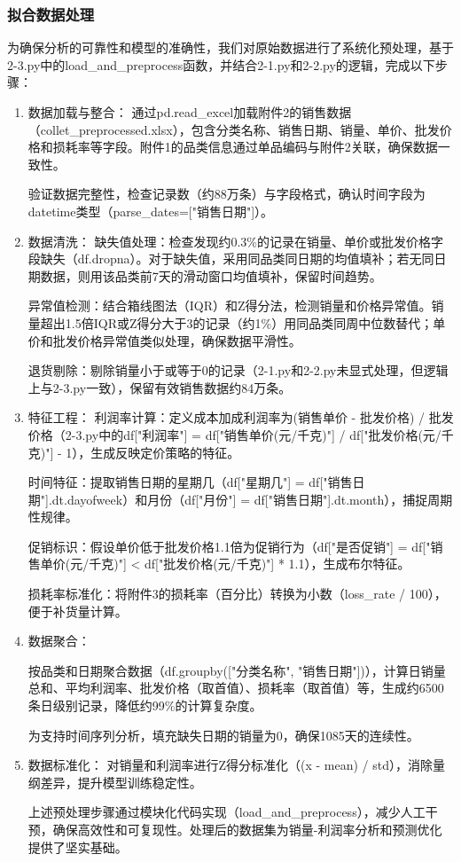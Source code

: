 \documentclass{cumcmthesis} %
\begin{document}
\subsubsection{拟合数据处理}

为确保分析的可靠性和模型的准确性，我们对原始数据进行了系统化预处理，基于2-3.py中的load\_and\_preprocess函数，并结合2-1.py和2-2.py的逻辑，完成以下步骤：

\begin{enumerate}
    
\item 数据加载与整合：
通过pd.read\_excel加载附件2的销售数据（collet\_preprocessed.xlsx），包含分类名称、销售日期、销量、单价、批发价格和损耗率等字段。附件1的品类信息通过单品编码与附件2关联，确保数据一致性。


验证数据完整性，检查记录数（约88万条）与字段格式，确认时间字段为datetime类型（parse\_dates=["销售日期"]）。
    
\item 数据清洗：
缺失值处理：检查发现约0.3\%的记录在销量、单价或批发价格字段缺失（df.dropna）。对于缺失值，采用同品类同日期的均值填补；若无同日期数据，则用该品类前7天的滑动窗口均值填补，保留时间趋势。


异常值检测：结合箱线图法（IQR）和Z得分法，检测销量和价格异常值。销量超出1.5倍IQR或Z得分大于3的记录（约1\%）用同品类同周中位数替代；单价和批发价格异常值类似处理，确保数据平滑性。


退货剔除：剔除销量小于或等于0的记录（2-1.py和2-2.py未显式处理，但逻辑上与2-3.py一致），保留有效销售数据约84万条。
    
\item 特征工程：
利润率计算：定义成本加成利润率为(销售单价 - 批发价格) / 批发价格（2-3.py中的df["利润率"] = df["销售单价(元/千克)"] / df["批发价格(元/千克)"] - 1），生成反映定价策略的特征。


时间特征：提取销售日期的星期几（df["星期几"] = df["销售日期"].dt.dayofweek）和月份（df["月份"] = df["销售日期"].dt.month），捕捉周期性规律。


促销标识：假设单价低于批发价格1.1倍为促销行为（df["是否促销"] = df["销售单价(元/千克)"] < df["批发价格(元/千克)"] * 1.1），生成布尔特征。


损耗率标准化：将附件3的损耗率（百分比）转换为小数（loss\_rate / 100），便于补货量计算。
    
\item 数据聚合：


按品类和日期聚合数据（df.groupby(["分类名称", "销售日期"])），计算日销量总和、平均利润率、批发价格（取首值）、损耗率（取首值）等，生成约6500条日级别记录，降低约99\%的计算复杂度。

为支持时间序列分析，填充缺失日期的销量为0，确保1085天的连续性。

\item 数据标准化：
对销量和利润率进行Z得分标准化（(x - mean) / std），消除量纲差异，提升模型训练稳定性。

上述预处理步骤通过模块化代码实现（load\_and\_preprocess），减少人工干预，确保高效性和可复现性。处理后的数据集为销量-利润率分析和预测优化提供了坚实基础。
\end{enumerate}
\end{document}

